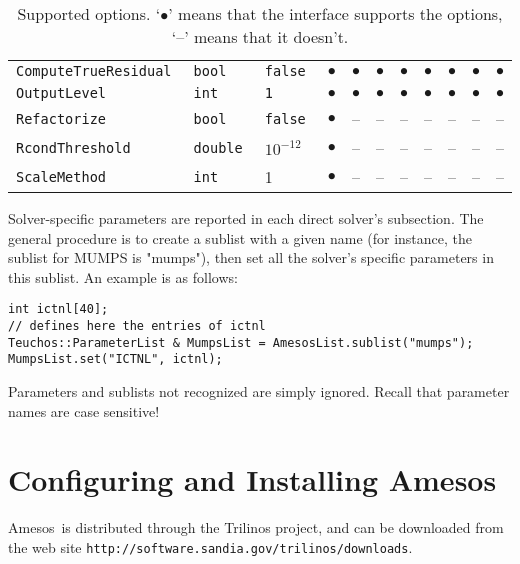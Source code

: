 \documentclass[11pt]{SANDreport}
\newcommand{\amesos}{{\sc Amesos}}
\begin{document}
\begin{sidewaystable}[tbhp]
\begin{tabular}{| p{5cm} | p{2cm} | p{2cm} | c | c | c
      | c | c | c | c | c |}
    \tt ComputeTrueResidual & \tt bool   & \tt false  & $\bullet$ & $\bullet$
    & $\bullet$ & $\bullet$ &  $\bullet$ & $\bullet$ & $\bullet$  & $\bullet$\\
    \tt OutputLevel         & \tt int    & \tt 1      & $\bullet$ & $\bullet$
    & $\bullet$ & $\bullet$ &  $\bullet$ & $\bullet$ & $\bullet$  & $\bullet$\\
    \tt Refactorize         & \tt bool   & \tt false  & $\bullet$ & -- & -- & -- &  -- & -- & -- & -- \\
    \tt RcondThreshold      & \tt double & $10^{-12}$ & $\bullet$ & -- & -- & -- &  -- & -- & -- & -- \\
    \tt ScaleMethod         & \tt int    & 1          & $\bullet$ & -- & -- & -- &  -- & -- & -- & -- \\
    \hline
  \end{tabular}
  \caption{Supported options. `$\bullet$' means that the interface
    supports the options, `--' means that it doesn't.}
  \label{tab:options}
\end{sidewaystable}

Solver-specific parameters are reported in each direct solver's subsection.
The general procedure is to create a sublist with a given name (for
instance, the sublist for MUMPS is "mumps"), then set all the
solver's specific parameters in this sublist. An example is as follows:
\begin{verbatim}
int ictnl[40];
// defines here the entries of ictnl
Teuchos::ParameterList & MumpsList = AmesosList.sublist("mumps");
MumpsList.set("ICTNL", ictnl);
\end{verbatim}
Parameters and sublists not recognized are simply ignored. Recall that
parameter names are case sensitive!

\section{Configuring and Installing \amesos}
\label{sec:configuration}

\amesos\ is distributed through the Trilinos project, and can be
downloaded from the web site
\verb!http://software.sandia.gov/trilinos/downloads!.
\end{document}
